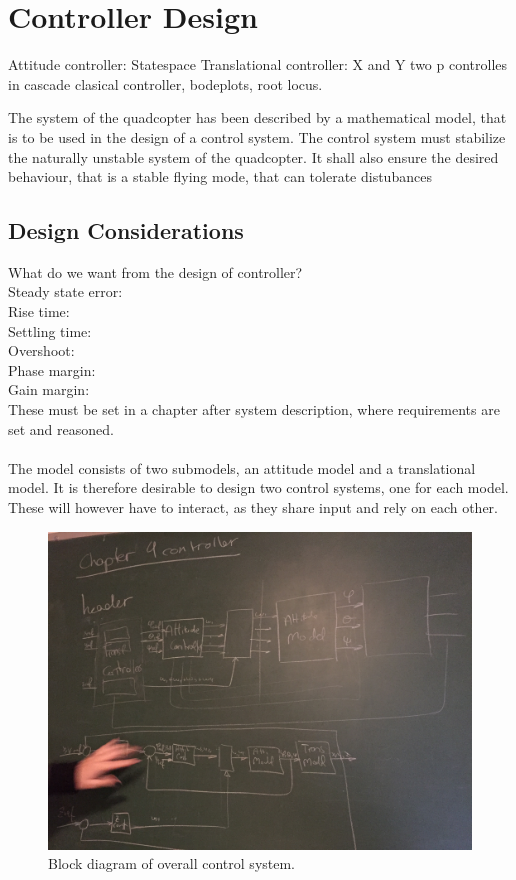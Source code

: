 \chapter{Controller Design}\label{chap:Control}
Attitude controller: Statespace 
Translational controller: X and Y two p controlles in cascade 
clasical controller, bodeplots, root locus. 


The system of the quadcopter has been described by a mathematical model, that is to be used in the design of a control system. The control system must stabilize the naturally unstable system of the quadcopter. It shall also ensure the desired behaviour, that is a stable flying mode, that can tolerate distubances 

\section{Design Considerations}
What do we want from the design of controller? \\
Steady state error: \\
Rise time: \\
Settling time:\\
Overshoot:\\
Phase margin: \\
Gain margin: \\
These must be set in a chapter after system description, where requirements are set and reasoned. \\
\\

The model consists of two submodels, an attitude model and a translational model. It is therefore desirable to design two control systems, one for each model. These will however have to interact, as they share input and rely on each other. 

\begin{figure}[H]
	\centering
	\includegraphics[width=0.7 \textwidth]{figures/ControlHeadDiagram.JPG}
	\caption{Block diagram of overall control system.}
	\label{fig:ControlHeadDiagram}
\end{figure}


